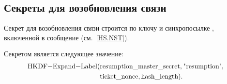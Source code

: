 \subsection{Секреты для возобновления связи}\label{CRYPTO.Resume}

Секрет для возобновления связи строится по ключу 
 и синхропосылке ,  
включенной в сообщение  (см.~\ref{HS.NST}).

Секретом является следующее значение:
%
\begin{align*}
\code{HKDF-Expand-Label}(&\code{resumption_master_secret},\str{resumption},\\
&\code{ticket_nonce}, \code{hash_length}).
\end{align*}

